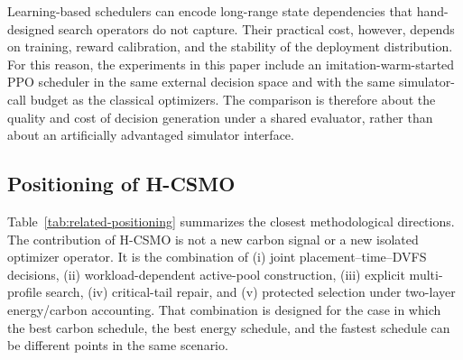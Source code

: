 \documentclass[preprint,12pt]{elsarticle}
\newcommand{\method}{H-CSMO\xspace}
\begin{document}
Learning-based schedulers can encode long-range state dependencies that hand-designed search operators do not capture. Their practical cost, however, depends on training, reward calibration, and the stability of the deployment distribution. For this reason, the experiments in this paper include an imitation-warm-started PPO scheduler in the same external decision space and with the same simulator-call budget as the classical optimizers. The comparison is therefore about the quality and cost of decision generation under a shared evaluator, rather than about an artificially advantaged simulator interface.

\subsection{Positioning of \method}

Table~\ref{tab:related-positioning} summarizes the closest methodological directions. The contribution of \method is not a new carbon signal or a new isolated optimizer operator. It is the combination of (i) joint placement--time--DVFS decisions, (ii) workload-dependent active-pool construction, (iii) explicit multi-profile search, (iv) critical-tail repair, and (v) protected selection under two-layer energy/carbon accounting. That combination is designed for the case in which the best carbon schedule, the best energy schedule, and the fastest schedule can be different points in the same scenario.
\end{document}
